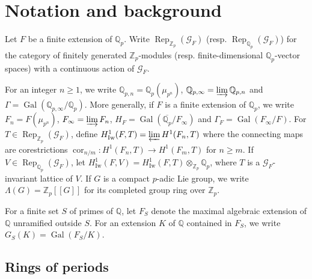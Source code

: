 \documentclass{amsart}
\newcommand{\QQ}{\mathbb Q}
\newcommand{\ZZ}{\mathbb Z}
\DeclareMathOperator{\Gal}{Gal}
\DeclareMathOperator{\Iw}{Iw}
\DeclareMathOperator{\cor}{cor}
\DeclareMathOperator{\Rep}{Rep}
\newcommand{\calG}{\mathcal{G}}
\begin{document}
 \section{Notation and background}  
 
  Let $F$ be a finite extension of $\QQ_p$. Write $\Rep_{\ZZ_p}(\calG_F)$ (resp. $\Rep_{\QQ_p}(\calG_F)$) for the category of finitely generated $\ZZ_p$-modules (resp. finite-dimensional $\QQ_p$-vector spaces) with a continuous action of $\calG_F$. 

  For an integer $n\geq 1$, we write $\QQ_{p,n}=\QQ_p(\mu_{p^n})$, $\QQ_{p,\infty}=\varinjlim \QQ_{p,n}$ and $\Gamma=\Gal(\QQ_{p,\infty}\slash\QQ_p)$. More generally, if $F$ is a finite extension of $\QQ_p$, we write $F_n=F(\mu_{p^n})$, $F_\infty=\varinjlim F_n$, $H_F=\Gal(\overline{\QQ_p}\slash F_\infty)$ and $\Gamma_F=\Gal(F_{\infty}\slash F)$. For $T\in\Rep_{\ZZ_p}(\calG_F)$, define $H^1_{\Iw}(F,T)=\varprojlim H^1(F_n,T)$ where the connecting maps are corestrictions $\cor_{n/m}:H^1(F_n,T)\rightarrow H^1(F_m,T)$ for $n\ge m$. If $V\in\Rep_{\QQ_p}(\calG_F)$, let $H^1_{\Iw}(F,V)=H^1_{\Iw}(F,T)\otimes_{\ZZ_p}\QQ_p$, where $T$ is a $\calG_F$-invariant lattice of $V$. If $G$ is a compact $p$-adic Lie group, we write $\Lambda(G)=\ZZ_p[[G]]$ for its completed group ring over $\ZZ_p$. 
 
  For a finite set $S$ of primes of $\QQ$, let $F_S$ denote the maximal algebraic extension of $\QQ$ unramified outside $S$. For an extension $K$ of $\QQ$ contained in $F_S$, we write $G_S(K)=\Gal(F_S\slash K)$. 

 
  \subsection{Rings of periods}\label{overcon}
 
\end{document}
